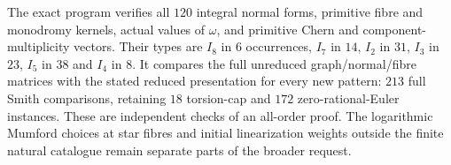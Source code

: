 The exact program 
verifies all $120$ integral normal forms, primitive fibre
and monodromy kernels, actual values of $\omega$, and
primitive Chern and component-multiplicity vectors.
Their types are $I_8$ in $6$ occurrences, $I_7$ in $14$,
$I_2$ in $31$, $I_3$ in $23$, $I_5$ in $38$ and $I_4$
in $8$. It compares the full unreduced graph/normal/fibre
matrices with the stated reduced presentation for every
new pattern: $213$ full Smith comparisons, retaining
$18$ torsion-cap and $172$ zero-rational-Euler instances.
These are independent checks of an all-order proof.
The logarithmic Mumford choices at star fibres and
initial linearization weights outside the finite natural
catalogue remain separate parts of the broader request.
